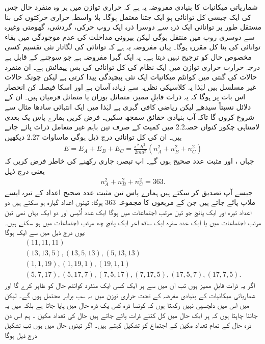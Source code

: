 شماریاتی میکانیات کا بنیادی مفروضہ یہ ہے کہ حراری توازن میں ہر وہ منفرد حال جس کی ایک جیسی کل توانائی  ہو ایک جتنا معتمل ہوگا۔ بلا واسطہ حراری حرکتوں کی بنا مستقل طور پر توانائی ایک ذرہ سے دوسرا ذرہ ایک روپ حرکی، گردشی، گھومتی وغیرہ سے دوسری روپ میں منتقل ہوگی لیکن بیرونی مداخلت کی عدم موجودگی میں بقاء توانائی کی بنا کل مقررہ ہوگا۔ یہاں مفروضہ یہ ہے  کہ توانائی کی لگاتار نئی تقسیم کسی مخصوص حال کو ترجیح نہیں دیتا ہے۔ یہ ایک گہرا مفروضہ ہے جو سوچنے کے قابل ہے درجہ حرارت  حراری توازن میں ایک نظام کی کل توانائی کی بس پیمائش ہے۔ ان منفرد حالات کی گنتی میں کوانٹم میکانیات ایک نئی پیچیدگی پیدا کرتی ہے لیکن چونکہ حالات غیر مسلسل ہیں لہٰذا یہ کلاسیکی نظریہ سے زیادہ آسان ہے اور اسکا فیصلہ کن انحصار اس بات پر ہوگا کہ یہ ذرات قابلِ ممیز، متماثل بوزان یا متماثل فرمیان ہیں۔ ان کے دلائل نسبتاً سیدھے لیکن ریاضی کافی گہری ہے لہٰذا میں ایک انتہائی سادھا مثال سے شروع کروں گا تاکہ آپ بنیادی حقائق سمجھ سکیں۔
فرض کریں ہمارے پاس یک بعدی لامتناہی چکور کنواں حصہ\num{2.2} میں کمیت  کے صرف تین باہم غیر متعامل ذرات پائے جاتے ہیں۔ ان کی کل توانائی درج ذیل ہوگی ماساوات \num{2.27} دیکھیں
\begin{align}
	E = E_A + E_B + E_C = \frac{\pi^2 \hslash ^2}{2ma^2}(n^2_A + n^2_B + n^2_C)
\end{align}
جہاں ،  اور  مثبت عدد صحیح ہوں گے۔ اب تبصرہ جاری رکھنے کی خاطر فرض کریں کہ یعنی درج ذیل
\begin{align}
	n^2_A + n^2_B + n^2_C = 363.
\end{align}  
جیسے آپ تصدیق کر سکتے ہیں ہمارے پاس تین مثبت عدد صحیح اعداد کے تیرہ ایسے ملاپ  پائے جاتے ہیں جن کے مربعوں کا مجموعہ \num{363} ہوگا: تینوں اعداد گیارہ ہو سکتے ہیں دو اعداد تیرہ  اور ایک پانچ جو تین مرتب اجتماعات میں ہوگا ایک عدد اُٗنّیس اور دو ایک یہاں نھی تین مرتب اجتماعات میں یا ایک عدد سترہ ایک ساٹھ اعر ایک پانچ چھ مرتب اجتماعات میں ہو سکتے ہیں۔ یوں   درج ذیل میں سے ایک ہوگا:
\begin{align*}
	(11, 11, 11)\\
	(13, 13, 5), (13, 5, 13), (5, 13, 13)\\
	(1, 1, 19), (1, 19, 1), (19, 1, 1)\\
	(5, 7, 17), (5, 17, 7), (7, 5, 17), (7, 17, 5), (17, 5, 7), (17, 7, 5).
\end{align*}
اگر یہ ذرات قابلِ ممیز ہوں تب ان میں سے ہر ایک کسی ایک منفرد کوانٹم حال کو ظاہر کرے گا اور شماریاتی میکانیات کے بنیادی مفرضہ کے تحت حراری توزن میں یہ سب برابر محتمل ہوں گے۔ لیکن میں اس میں دلچسپی نہیں رکھتا ہوں کہ کونسا ذرہ کس یک ذرہ حال میں پایا جاتا ہے بلکہ میں یہ جاننا چاہتا ہوں کہ ہر ایک حال میں کل کتنے ذرات پائے جاتے ہیں حال کی تعداد مکین ۔ ہم اس دن ذرہ حال کے تمام تعدادِ مکین کے اجتماع کو تشکیل  کہتے ہیں۔ اگر تینوں حال   میں ہوں تب تشکیل  درج ذیل ہوگا
